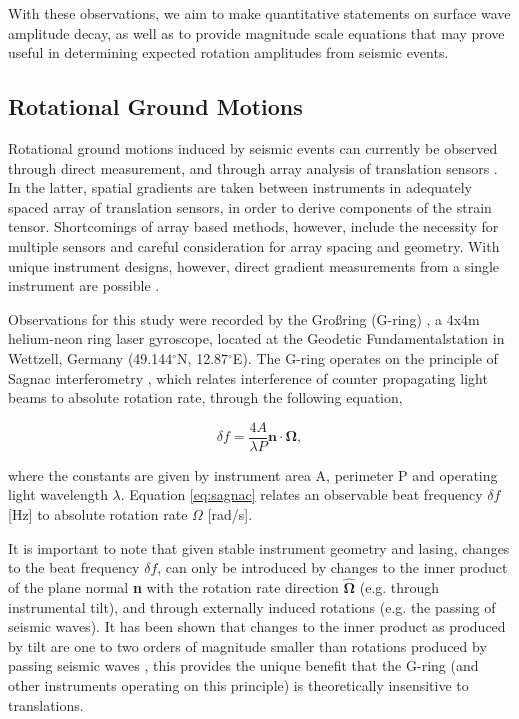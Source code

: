 \documentclass{gji}
\begin{document}
With these observations, we aim to make quantitative statements on surface wave amplitude decay, as well as to provide magnitude scale equations that may prove useful in determining expected rotation amplitudes from seismic events.

\subsection{Rotational Ground Motions}
Rotational ground motions induced by seismic events can currently be observed through direct measurement, and through array analysis of translation sensors \cite{spudich1995transient}.
In the latter, spatial gradients are taken between instruments in adequately spaced array of translation sensors, in order to derive components of the strain tensor. Shortcomings of array based methods, however, include the necessity for multiple sensors and careful consideration for array spacing and geometry. With unique instrument designs, however, direct gradient measurements from a single instrument are  possible \cite{schreiber2006ring}. %

Observations for this study were recorded by the Gro\ss ring (G-ring) \cite{schreiber2006ring} , a 4x4m helium-neon ring laser gyroscope, located at the Geodetic Fundamentalstation in Wettzell, Germany (49.144$^\circ$N, 12.87$^\circ$E). The G-ring operates on the principle of Sagnac interferometry \cite{stedman1997ring}, which relates interference of counter propagating light beams to absolute rotation rate, through the following equation, 

\begin{equation}\label{eq:sagnac}
	\delta f = \frac{4A}{\lambda P}\mathbf{n}\cdot \mathbf{\Omega},
\end{equation}

\noindent where the constants are given by instrument area A, perimeter P and operating light wavelength $\lambda$. Equation \ref{eq:sagnac} relates an observable beat frequency $\delta f$ [Hz] to absolute rotation rate $\Omega$ [rad/s].

It is important to note that given stable instrument geometry and lasing, changes to the beat frequency $\delta f$, can only be introduced by changes to the inner product of the plane normal {\bfseries n} with the rotation rate direction $\mathbf{\hat{\Omega}}$ (e.g. through instrumental tilt), and through externally induced rotations (e.g. the passing of seismic waves). It has been shown that changes to the inner product as produced by tilt are one to two orders of magnitude smaller than rotations produced by passing seismic waves \cite{mcleod1998comparison} \cite{schreiber2006ring} , this provides the unique benefit that the G-ring (and other instruments operating on this principle) is theoretically insensitive to translations.
\end{document}
